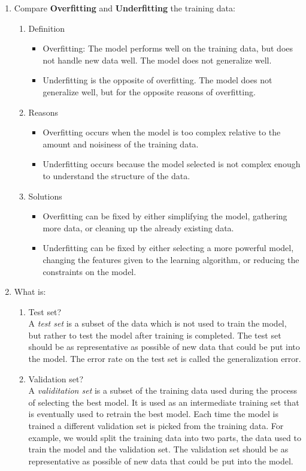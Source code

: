 \documentclass[a4paper,10pt]{article}
\begin{document}
\begin{enumerate}
	\item Compare \textbf{Overfitting} and \textbf{Underfitting} the training data:
	\begin{enumerate}
		\item Definition
		\begin{itemize}
			\item Overfitting: The model performs well on the training data, but does not handle new data well. The model does not generalize well.
			\item Underfitting is the opposite of overfitting. The model does not generalize well, but for the opposite reasons of overfitting.
		\end{itemize}
		\item Reasons
		\begin{itemize}
			\item Overfitting occurs when the model is too complex relative to the amount and noisiness of the training data.
			\item Underfitting occurs because the model selected is not complex enough to understand the structure of the data.
		\end{itemize}
		\item Solutions
		\begin{itemize}
			\item Overfitting can be fixed by either simplifying the model, gathering more data, or cleaning up the already existing data.
			\item Underfitting can be fixed by either selecting a more powerful model, changing the features given to the learning algorithm, or reducing the constraints on the model.
		\end{itemize}
	\end{enumerate}
	
	\item What is:
	\begin{enumerate}
		\item Test set? \\
		A \emph{test set} is a subset of the data which is not used to train the model, but rather to test the model after training is completed. 
		The test set should be as representative as possible of new data that could be put into the model. 
		The error rate on the test set is called the generalization error.
		
		\item Validation set? \\
		A \emph{validitation set} is a subset of the training data used during the process of selecting the best model.
		It is used as an intermediate training set that is eventually used to retrain the best model.
		Each time the model is trained a different validation set is picked from the training data.
		For example, we would split the training data into two parts, the data used to train the model and the validation set.
		The validation set should be as representative as possible of new data that could be put into the model. 
		

\end{enumerate}
\end{enumerate}
\end{document}

